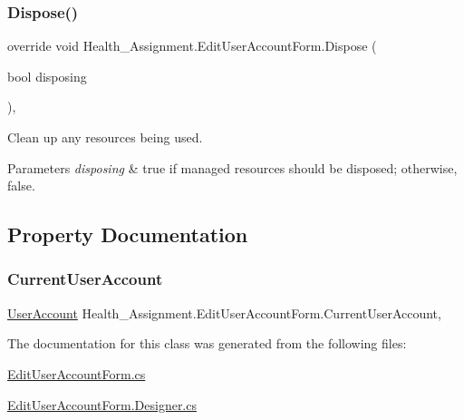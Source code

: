 \subsubsection{\texorpdfstring{Dispose()}{Dispose()}}
{\footnotesize\ttfamily override void Health\+\_\+\+Assignment.\+Edit\+User\+Account\+Form.\+Dispose (\begin{DoxyParamCaption}\item[{bool}]{disposing }\end{DoxyParamCaption})\hspace{0.3cm}{\ttfamily [inline]}, {\ttfamily [protected]}}



Clean up any resources being used. 


\begin{DoxyParams}{Parameters}
{\em disposing} & true if managed resources should be disposed; otherwise, false.\\
\hline
\end{DoxyParams}


\subsection{Property Documentation}
\mbox{\label{class_health___assignment_1_1_edit_user_account_form_acadb95235997f30847e6fc9accd2374d}} 
\subsubsection{\texorpdfstring{Current\+User\+Account}{CurrentUserAccount}}
{\footnotesize\ttfamily \hyperlink{class_health___assignment_1_1_user_account}{User\+Account} Health\+\_\+\+Assignment.\+Edit\+User\+Account\+Form.\+Current\+User\+Account\hspace{0.3cm}{\ttfamily [get]}, {\ttfamily [set]}}



The documentation for this class was generated from the following files\+:\begin{DoxyCompactItemize}
\item 
\hyperlink{_edit_user_account_form_8cs}{Edit\+User\+Account\+Form.\+cs}\item 
\hyperlink{_edit_user_account_form_8_designer_8cs}{Edit\+User\+Account\+Form.\+Designer.\+cs}\end{DoxyCompactItemize}
